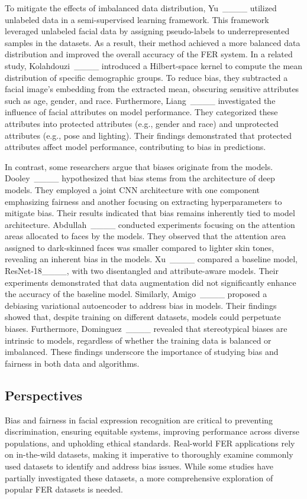 To mitigate the effects of imbalanced data distribution, Yu~\etal____ utilized unlabeled data in a semi-supervised learning framework. This framework leveraged unlabeled facial data by assigning pseudo-labels to underrepresented samples in the datasets. As a result, their method achieved a more balanced data distribution and improved the overall accuracy of the FER system. In a related study, Kolahdouzi~\etal____ introduced a Hilbert-space kernel to compute the mean distribution of specific demographic groups. To reduce bias, they subtracted a facial image's embedding from the extracted mean, obscuring sensitive attributes such as age, gender, and race. Furthermore, Liang~\etal____ investigated the influence of facial attributes on model performance. They categorized these attributes into protected attributes (e.g., gender and race) and unprotected attributes (e.g., pose and lighting). Their findings demonstrated that protected attributes affect model performance, contributing to bias in predictions.

In contrast, some researchers argue that biases originate from the models. Dooley~\etal____ hypothesized that bias stems from the architecture of deep models. They employed a joint CNN architecture with one component emphasizing fairness and another focusing on extracting hyperparameters to mitigate bias. Their results indicated that bias remains inherently tied to model architecture. Abdullah~\etal____ conducted experiments focusing on the attention areas allocated to faces by the models. They observed that the attention area assigned to dark-skinned faces was smaller compared to lighter skin tones, revealing an inherent bias in the models. Xu~\etal____ compared a baseline model, ResNet-18____, with two disentangled and attribute-aware models. Their experiments demonstrated that data augmentation did not significantly enhance the accuracy of the baseline model. Similarly, Amigo~\etal____ proposed a debiasing variational autoencoder to address bias in models. Their findings showed that, despite training on different datasets, models could perpetuate biases. Furthermore, Dominguez~\etal____ revealed that stereotypical biases are intrinsic to models, regardless of whether the training data is balanced or imbalanced. These findings underscore the importance of studying bias and fairness in both data and algorithms.

\subsection{Perspectives}
Bias and fairness in facial expression recognition are critical to preventing discrimination, ensuring equitable systems, improving performance across diverse populations, and upholding ethical standards. Real-world FER applications rely on in-the-wild datasets, making it imperative to thoroughly examine commonly used datasets to identify and address bias issues. While some studies have partially investigated these datasets, a more comprehensive exploration of popular FER datasets is needed.


